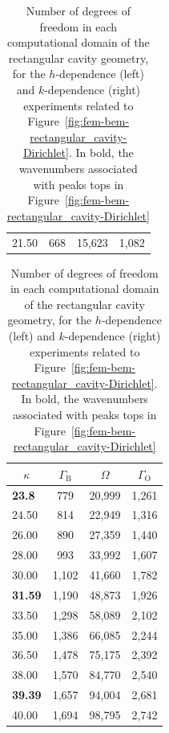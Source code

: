 \documentclass[a4paper,11pt]{article}
\begin{document}
\begin{appendix}
\begin{table}[ht]
{\begin{tabular}{l|ccc}
    21.50                           & 668          & 15,623     & 1,082     
  \end{tabular}
  \hspace{0.2cm}
  \begin{tabular}{l|ccc}
    \multicolumn{1}{c|}{\(\kappa\)} & \(\Gamma_{\text{B}}\) & \(\Omega\) & \(\Gamma_{\text{O}}\) \\ \hline
    \textbf{23.8}                   & 779          & 20,999     & 1,261        \\
    24.50                           & 814          & 22,949     & 1,316        \\
    26.00                           & 890          & 27,359     & 1,440        \\
    28.00                           & 993          & 33,992     & 1,607        \\
    30.00                           & 1,102        & 41,660     & 1,782        \\
    \textbf{31.59}                  & 1,190        & 48,873     & 1,926        \\
    33.50                           & 1,298        & 58,089     & 2,102        \\
    35.00                           & 1,386        & 66,085     & 2,244        \\
    36.50                           & 1,478        & 75,175     & 2,392        \\
    38.00                           & 1,570        & 84,770     & 2,540        \\
    \textbf{39.39}                  & 1,657        & 94,004     & 2,681        \\
    40.00                           & 1,694        & 98,795     & 2,742         
  \end{tabular}
  }
  \caption{Number of degrees of freedom in each computational domain of the rectangular cavity geometry, for the \(h\)-dependence (left) and \(k\)-dependence (right) experiments related to Figure~\ref{fig:fem-bem-rectangular_cavity-Dirichlet}. In bold, the wavenumbers associated with peaks tops in Figure~\ref{fig:fem-bem-rectangular_cavity-Dirichlet}}
  \label{table:dof_cavity}
\end{table}



\end{appendix}





\end{document}
